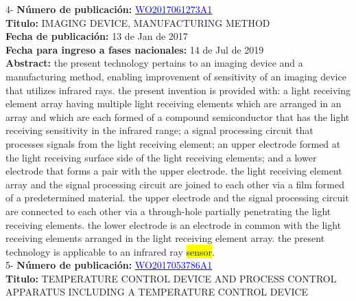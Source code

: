  \vspace{1cm}4- \textbf{Número de publicación:} \href{https://worldwide.espacenet.com/publicationDetails/biblio?DB=EPODOC&II=0&ND=3&adjacent=true&locale=en_EP&FT=D&date=20160331&CC=WO&NR=2017061273A1&KC=A1#}{\textcolor{blue}{WO2017061273A1}}\\ 
\textbf{Titulo:} IMAGING DEVICE, MANUFACTURING METHOD\\ 
 
\textbf{Fecha de publicación:} 13 de Jan de 2017\\ 
\textbf{Fecha para ingreso a fases nacionales:} 14 de Jul de 2019\\ 
\textbf{Abstract:} the present technology pertains to an imaging device and a manufacturing method, enabling improvement of sensitivity of an imaging device that utilizes infrared rays. the present invention is provided with: a light receiving element array having multiple light receiving elements which are arranged in an array and which are each formed of a compound semiconductor that has the light receiving sensitivity in the infrared range; a signal processing circuit that processes signals from the light receiving element; an upper electrode formed at the light receiving surface side of the light receiving elements; and a lower electrode that forms a pair with the upper electrode. the light receiving element array and the signal processing circuit are joined to each other via a film formed of a predetermined material. the upper electrode and the signal processing circuit are connected to each other via a through-hole partially penetrating the light receiving elements. the lower electrode is an electrode in common with the light receiving elements arranged in the light receiving element array. the present technology is applicable to an infrared ray \colorbox{yellow}{sensor}.\\ 
 

 \vspace{1cm}5- \textbf{Número de publicación:} \href{https://worldwide.espacenet.com/publicationDetails/biblio?DB=EPODOC&II=0&ND=3&adjacent=true&locale=en_EP&FT=D&date=20160331&CC=WO&NR=2017053786A1&KC=A1#}{\textcolor{blue}{WO2017053786A1}}\\ 
\textbf{Titulo:} TEMPERATURE CONTROL DEVICE AND PROCESS CONTROL APPARATUS INCLUDING A TEMPERATURE CONTROL DEVICE\\ 
 
